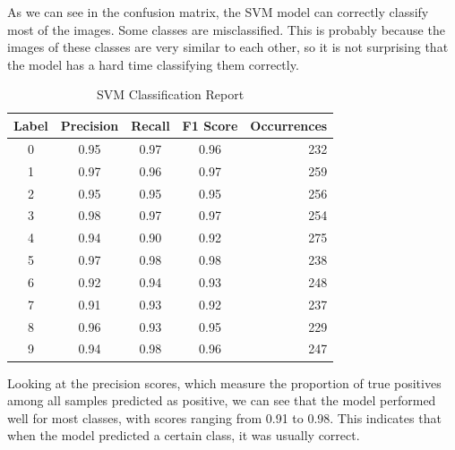 \documentclass[conference]{IEEEtran}
\begin{document}
As we can see in the confusion matrix, the SVM model can correctly classify most of the images. 
Some classes are misclassified. This is probably because the images of these classes are very similar to each other, so it is not surprising that the model has a hard time classifying them correctly.

\begin{table}[!h]
    \centering
    \begin{tabular}{|c|c|c|c|r|}
        \hline
        \textbf{Label} & \textbf{Precision} & \textbf{Recall} & F1 Score & \multicolumn{1}{c|}{\textbf{Occurrences}} \\ \hline
        0              & 0.95               & 0.97            & 0.96     & 232                                       \\ \hline
        1              & 0.97               & 0.96            & 0.97     & 259                                       \\ \hline
        2              & 0.95               & 0.95            & 0.95     & 256                                       \\ \hline
        3              & 0.98               & 0.97            & 0.97     & 254                                       \\ \hline
        4              & 0.94               & 0.90            & 0.92     & 275                                       \\ \hline
        5              & 0.97               & 0.98            & 0.98     & 238                                       \\ \hline
        6              & 0.92               & 0.94            & 0.93     & 248                                       \\ \hline
        7              & 0.91               & 0.93            & 0.92     & 237                                       \\ \hline
        8              & 0.96               & 0.93            & 0.95     & 229                                       \\ \hline
        9              & 0.94               & 0.98            & 0.96     & 247                                       \\ \hline
    \end{tabular}
    \label{tab:svm_classification_report}
    \caption{SVM Classification Report}
\end{table}
Looking at the precision scores, which measure the proportion of true positives among all samples predicted as positive, we can see that the model performed well for most classes, with scores ranging from 0.91 to 0.98. This indicates that when the model predicted a certain class, it was usually correct.
\end{document}
